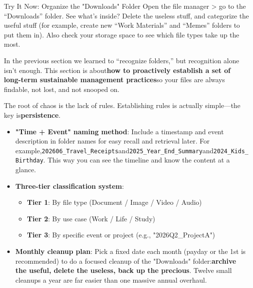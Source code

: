 \begin{tcbpractice}{Try It Now: Organize the "Downloads" Folder}
Open the file manager > go to the “Downloads” folder. See what's inside? Delete the useless stuff, and categorize the useful stuff (for example, create new “Work Materials” and “Memes” folders to put them in). Also check your storage space to see which file types take up the most.

\end{tcbpractice}


In the previous section we learned to “recognize folders,” but recognition alone isn't enough. This section is about\textbf{how to proactively establish a set of long-term sustainable management practices}so your files are always findable, not lost, and not snooped on.


The root of chaos is the lack of rules. Establishing rules is actually simple—the key is\textbf{persistence}.

\begin{itemize}
  \item \textbf{"Time + Event" naming method}: Include a timestamp and event description in folder names for easy recall and retrieval later. For example,\texttt{202606\_Travel\_Receipts}and\texttt{2025\_Year\_End\_Summary}and\texttt{2024\_Kids\_Birthday}. This way you can see the timeline and know the content at a glance.
  \item \textbf{Three-tier classification system}:
  \begin{itemize}
    \item \textbf{Tier 1}: By file type (Document / Image / Video / Audio)
    \item \textbf{Tier 2}: By use case (Work / Life / Study)
    \item \textbf{Tier 3}: By specific event or project (e.g., "2026Q2\_ProjectA")
  \end{itemize}
  \item \textbf{Monthly cleanup plan}: Pick a fixed date each month (payday or the 1st is recommended) to do a focused cleanup of the "Downloads" folder:\textbf{archive the useful, delete the useless, back up the precious}. Twelve small cleanups a year are far easier than one massive annual overhaul.
\end{itemize}

